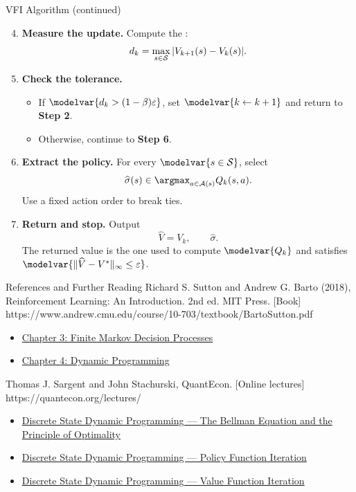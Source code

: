 \begin{frame}{VFI Algorithm (continued)}
\small
\setlength{\abovedisplayskip}{4pt}
\setlength{\belowdisplayskip}{4pt}
\begin{enumerate}
\setcounter{enumi}{3}
\item \textbf{Measure the update.} Compute the :
\[d_k=\max_{s\in\mathcal S}|V_{k+1}(s)-V_k(s)|.\]
\item \textbf{Check the tolerance.}
\begin{itemize}
\item If \(\modelvar{d_k>(1-\beta)\varepsilon}\), set \(\modelvar{k\leftarrow k+1}\) and return to \textbf{Step 2}.
\item Otherwise, continue to \textbf{Step 6}.
\end{itemize}
\item \textbf{Extract the policy.} For every \(\modelvar{s\in\Sset}\), select
\[\widehat\sigma(s)\in\argmax_{a\in\Aset(s)}Q_k(s,a).\]
Use a fixed action order to break ties.
\item \textbf{Return and stop.} Output
\[\widehat V=V_k,\qquad\widehat\sigma.\]
The returned value is the one used to compute \(\modelvar{Q_k}\) and satisfies \(\modelvar{\|\widehat V-V^*\|_\infty\leq\varepsilon}\).
\end{enumerate}
\end{frame}

\begin{frame}{References and Further Reading}
  {Richard S. Sutton and Andrew G. Barto (2018), Reinforcement Learning: An Introduction. 2nd ed. MIT Press. [Book]}
  {https://www.andrew.cmu.edu/course/10-703/textbook/BartoSutton.pdf}
  {\begin{itemize}
\item \href{https://www.andrew.cmu.edu/course/10-703/textbook/BartoSutton.pdf\#page=69}{Chapter 3: Finite Markov Decision Processes}
\item \href{https://www.andrew.cmu.edu/course/10-703/textbook/BartoSutton.pdf\#page=95}{Chapter 4: Dynamic Programming}
\end{itemize}}
  {Thomas J. Sargent and John Stachurski, QuantEcon. [Online lectures]}
  {https://quantecon.org/lectures/}
  {\begin{itemize}
\item \href{https://tools-techniques.quantecon.org/discrete_dp.html\#the-bellman-equation-and-the-principle-of-optimality}{Discrete State Dynamic Programming — The Bellman Equation and the Principle of Optimality}
\item \href{https://tools-techniques.quantecon.org/discrete_dp.html\#policy-function-iteration}{Discrete State Dynamic Programming — Policy Function Iteration}
\item \href{https://tools-techniques.quantecon.org/discrete_dp.html\#value-function-iteration}{Discrete State Dynamic Programming — Value Function Iteration}
\end{itemize}}
\end{frame}

